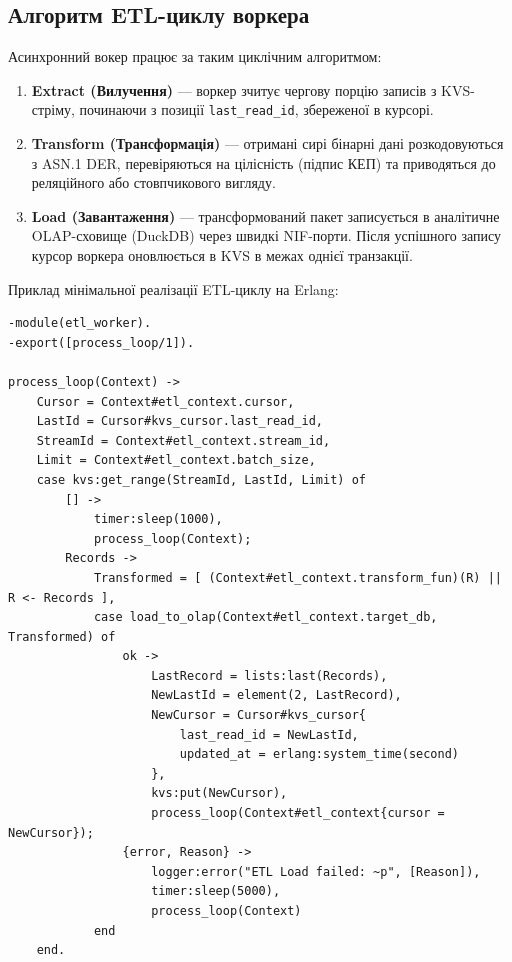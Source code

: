 \subsection{Алгоритм ETL-циклу воркера}
Асинхронний вокер працює за таким циклічним алгоритмом:
\begin{enumerate}
    \item \textbf{Extract (Вилучення)} --- воркер зчитує чергову порцію записів з KVS-стріму, починаючи з позиції \texttt{last\_read\_id}, збереженої в курсорі.
    \item \textbf{Transform (Трансформація)} --- отримані сирі бінарні дані розкодовуються з ASN.1 DER, перевіряються на цілісність (підпис КЕП) та приводяться до реляційного або стовпчикового вигляду.
    \item \textbf{Load (Завантаження)} --- трансформований пакет записується в аналітичне OLAP-сховище (DuckDB) через швидкі NIF-порти. Після успішного запису курсор воркера оновлюється в KVS в межах однієї транзакції.
\end{enumerate}

Приклад мінімальної реалізації ETL-циклу на Erlang:
\begin{lstlisting}
-module(etl_worker).
-export([process_loop/1]).

process_loop(Context) ->
    Cursor = Context#etl_context.cursor,
    LastId = Cursor#kvs_cursor.last_read_id,
    StreamId = Context#etl_context.stream_id,
    Limit = Context#etl_context.batch_size,
    case kvs:get_range(StreamId, LastId, Limit) of
        [] ->
            timer:sleep(1000),
            process_loop(Context);
        Records ->
            Transformed = [ (Context#etl_context.transform_fun)(R) || R <- Records ],            
            case load_to_olap(Context#etl_context.target_db, Transformed) of
                ok ->
                    LastRecord = lists:last(Records),
                    NewLastId = element(2, LastRecord),                    
                    NewCursor = Cursor#kvs_cursor{
                        last_read_id = NewLastId,
                        updated_at = erlang:system_time(second)
                    },                    
                    kvs:put(NewCursor),                    
                    process_loop(Context#etl_context{cursor = NewCursor});
                {error, Reason} ->
                    logger:error("ETL Load failed: ~p", [Reason]),
                    timer:sleep(5000),
                    process_loop(Context)
            end
    end.
\end{lstlisting}

